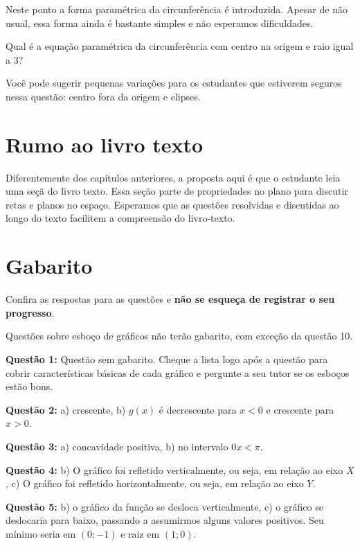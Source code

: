 \documentclass[main_estudante.tex]{subfiles}
\begin{document}
Neste ponto a forma paramétrica da circunferência é introduzida. Apesar de não usual, essa forma ainda é bastante simples e não esperamos dificuldades.

\begin{questao}
Qual é a equação paramétrica da circunferência com centro na origem e raio igual a 3?
\end{questao}

Você pode sugerir pequenas variações para os estudantes que estiverem seguros nessa questão: centro fora da origem e elipses.

\section{Rumo ao livro texto}

Diferentemente dos capítulos anteriores, a proposta aqui é que o estudante leia uma seçã do livro texto. Essa seção parte de propriedades no plano para discutir retas e planos no espaço. Esperamos que as questões resolvidas e discutidas ao longo do texto facilitem a compreensão do livro-texto.

\section{Gabarito}

Confira as respostas para as questões e \textbf{não se esqueça de registrar o seu progresso}.

Questões sobre esboço de gráficos não terão gabarito, com exceção da questão 10.

\noindent\textbf{Questão 1:} Questão sem gabarito. Cheque a lista logo após a questão para cobrir características básicas de cada gráfico e pergunte a seu tutor se os esboços estão bons.

\noindent\textbf{Questão 2:} a) crescente, b) $g(x)$ é decrescente para $x<0$ e crescente para $x>0$.

\noindent\textbf{Questão 3:} a) concavidade positiva, b) no intervalo $0x<\pi$.

\noindent\textbf{Questão 4:} b) O gráfico foi refletido verticalmente, ou seja, em relação ao eixo $X$, c) O gráfico foi refletido horizontalmente, ou seja, em relação ao eixo $Y$.

\noindent\textbf{Questão 5:} b) o gráfico da função se desloca verticalmente, c) o gráfico se deslocaria para baixo, passando a assumirmos alguns valores positivos. Seu mínimo seria em $(0;-1)$ e raiz em $(1;0)$.
\end{document}
